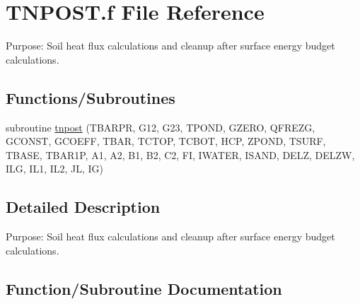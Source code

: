 \hypertarget{TNPOST_8f}{}\section{T\+N\+P\+O\+S\+T.\+f File Reference}
\label{TNPOST_8f}


Purpose\+: Soil heat flux calculations and cleanup after surface energy budget calculations.  


\subsection*{Functions/\+Subroutines}
\begin{DoxyCompactItemize}
\item 
subroutine \hyperlink{TNPOST_8f_a1d7de0e4ebe964e4c638efcb49b3c740}{tnpost} (T\+B\+A\+R\+P\+R, G12, G23, T\+P\+O\+N\+D, G\+Z\+E\+R\+O, Q\+F\+R\+E\+Z\+G, G\+C\+O\+N\+S\+T, G\+C\+O\+E\+F\+F, T\+B\+A\+R, T\+C\+T\+O\+P, T\+C\+B\+O\+T, H\+C\+P, Z\+P\+O\+N\+D, T\+S\+U\+R\+F, T\+B\+A\+S\+E, T\+B\+A\+R1\+P, A1, A2, B1, B2, C2, F\+I, I\+W\+A\+T\+E\+R, I\+S\+A\+N\+D, D\+E\+L\+Z, D\+E\+L\+Z\+W, I\+L\+G, I\+L1, I\+L2, J\+L, I\+G)
\end{DoxyCompactItemize}


\subsection{Detailed Description}
Purpose\+: Soil heat flux calculations and cleanup after surface energy budget calculations. 



\subsection{Function/\+Subroutine Documentation}
\hypertarget{TNPOST_8f_a1d7de0e4ebe964e4c638efcb49b3c740}{}
